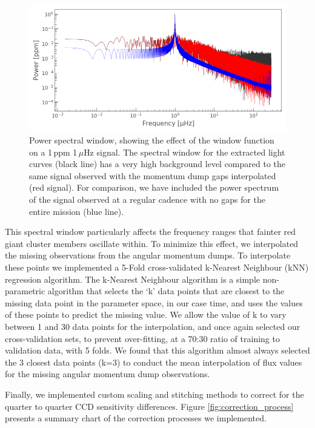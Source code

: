 \begin{figure}
    \centering
    \includegraphics[width=\linewidth]{Chapter5/window_function_example1uHz1ppm.png}
    \caption[Power spectral window, showing the effect of the \Kepler{} window function]{Power spectral window, showing the effect of the \Kepler{} window function on a 1\,ppm 1\,$\mu$Hz signal. The spectral window for the extracted light curves (black line) has a very high background level compared to the same signal observed with the momentum dump gaps interpolated (red signal). For comparison, we have included the power spectrum of the signal observed at a regular cadence with no gaps for the entire \Kepler{} mission (blue line).}
    \label{fig:window_function}
\end{figure}

This spectral window particularly affects the frequency ranges that fainter red giant cluster members oscillate within. To minimize this effect, we interpolated the missing observations from the angular momentum dumps. To interpolate these points we implemented a 5-Fold cross-validated k-Nearest Neighbour (kNN) regression algorithm. The k-Nearest Neighbour algorithm is a simple non-parametric algorithm that selects the `k' data points that are closest to the missing data point in the parameter space, in our case time, and uses the values of these points to predict the missing value. We allow the value of k to vary between 1 and 30 data points for the interpolation, and once again selected our cross-validation sets, to prevent over-fitting, at a 70:30 ratio of training to validation data, with 5 folds. We found that this algorithm almost always selected the 3 closest data points (k=3) to conduct the mean interpolation of flux values for the missing angular momentum dump observations.

Finally, we implemented custom scaling and stitching methods to correct for the quarter to quarter CCD sensitivity differences. Figure \ref{fig:correction_process} presents a summary chart of the correction processes we implemented.

